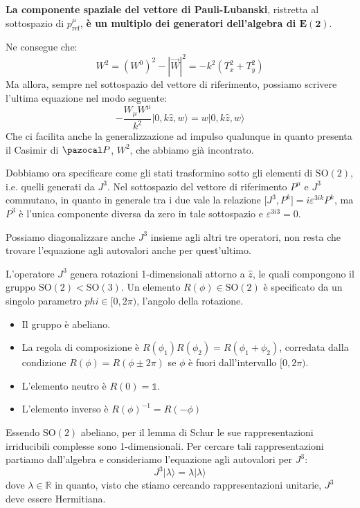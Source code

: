 \documentclass[../main.tex]{subfiles}
\begin{document}
\textbf{La componente spaziale del vettore di Pauli-Lubanski}, ristretta al sottospazio di $p^\mu_\text{ref}$, \textbf{è un multiplo dei generatori dell'algebra di $\mathbf{E(2)}$}.

Ne consegue che:
\[
W^2 = (W^0)^2 - |\Vec{W}|^2 = -k^2(T_x^2 + T_y^2)
\]
Ma allora, sempre nel sottospazio del vettore di riferimento, possiamo scrivere l'ultima equazione nel modo seguente:
\[
\boxed{-\frac{W_\mu W^\mu}{k^2}|0, k\hat{z}, w\rangle = w |0, k\hat{z}, w\rangle}
\]
Che ci facilita anche la generalizzazione ad impulso qualunque in quanto presenta il Casimir di $\pazocal P$, $W^2$, che abbiamo già incontrato.

Dobbiamo ora specificare come gli stati trasformino sotto gli elementi di $\text{SO}(2)$, i.e. quelli generati da $J^3$. Nel sottospazio del vettore di riferimento $P^\mu$ e $J^3$ commutano, in quanto in generale tra i due vale la relazione \(\big[J^3, P^k\big] = i\varepsilon^{3ik}P^k\), ma $P^3$ è l'unica componente diversa da zero in tale sottospazio e $\varepsilon^{3i3}=0$.

Possiamo diagonalizzare anche $J^3$ insieme agli altri tre operatori, non resta che trovare l'equazione agli autovalori anche per quest'ultimo.

\begin{nota}
    L'operatore $J^3$ genera rotazioni 1-dimensionali attorno a $\hat{z}$, le quali compongono il gruppo $\text{SO}(2) < \text{SO}(3)$. Un elemento $R(\phi) \in \text{SO}(2)$ è specificato da un singolo parametro $phi\in[0,2\pi)$, l'angolo della rotazione. 
    \begin{itemize}
        \item Il gruppo è abeliano.
        \item La regola di composizione è \(R(\phi_1) R(\phi_2) = R(\phi_1 + \phi_2)\), corredata dalla condizione $R(\phi) = R(\phi \pm 2\pi)$ se $\phi$ è fuori dall'intervallo $[0,2\pi)$.
        \item L'elemento neutro è $R(0) = \mathbb 1$.
        \item L'elemento inverso è $R(\phi)^{-1} = R(-\phi)$
    \end{itemize}
    \label{note:SO2}
\end{nota}

Essendo $\text{SO}(2)$ abeliano, per il lemma di Schur le sue rappresentazioni irriducibili complesse sono 1-dimensionali. Per cercare tali rappresentazioni partiamo dall'algebra e consideriamo l'equazione agli autovalori per $J^3$:
\[
J^3|\lambda\rangle = \lambda|\lambda\rangle
\]
dove $\lambda \in \mathbb R$ in quanto, visto che stiamo cercando rappresentazioni unitarie, $J^3$ deve essere Hermitiana.
\end{document}
